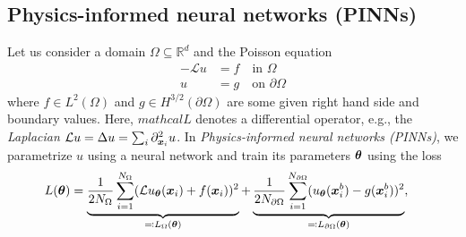 \subsection{Physics-informed neural networks (PINNs)}
Let us consider a domain $\Omega\subseteq\mathbb R^d$ and the Poisson equation %
\begin{align*}\tag{PE}\label{eq:PE}
  -\mathcal{L} u & = f \quad \text{in }\Omega \\
  u & = g \quad \text{on }\partial\Omega
\end{align*}
where $f\in L^2(\Omega)$ and $g\in H^{3/2}(\partial\Omega)$ are some given right hand side and boundary values.
Here, $mathcal{L}$ denotes a differential operator, e.g., the \emph{Laplacian} $\mathcal{L} u = \Delta u = \sum_i \partial_{{\bm{x}}_i}^2 u$.
In \emph{Physics-informed neural networks (PINNs)}, we parametrize $u$ using a neural network and train its parameters ${\bm{\theta}}$ using the loss
\begin{align}
  L({\bm{\theta}})
  &=
    \underbrace{\frac{1}{2N_\Omega} \sum_{i=1}^{N_\Omega} (\mathcal{L} u_{\bm{\theta}}({\bm{x}}_i) + f({\bm{x}}_i))^2}_{\eqqcolon L_\Omega({\bm{\theta}})} + \underbrace{\frac{1}{2N_{\partial\Omega}}\sum_{i=1}^{N_{\partial\Omega}} ( u_{\bm{\theta}}({\bm{x}}^b_i) - g({\bm{x}}^b_i))^2}_{\eqqcolon L_{\partial\Omega}({\bm{\theta}})},
\end{align}
